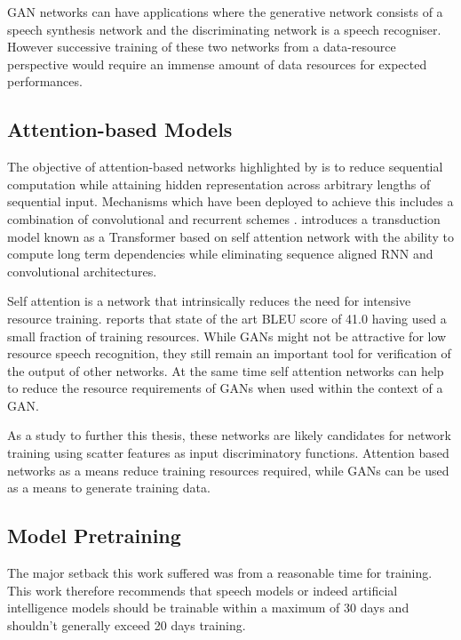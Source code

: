 GAN networks can have applications where the generative network consists of a speech synthesis network and the discriminating network is  a speech recogniser.  However successive training of these two networks from a data-resource perspective would require an immense amount of data resources for expected performances. 

\subsection{Attention-based Models}

The objective of attention-based networks highlighted by  \cite{vaswani2017attention} is to reduce sequential computation while attaining hidden representation across arbitrary lengths of sequential input. Mechanisms which have been deployed to achieve this includes a combination of convolutional and recurrent schemes \citep{kaiser2016can,kalchbrenner2016neural, gehring2017convolutional}. \cite{vaswani2017attention} introduces a transduction model known as a Transformer based on self attention network with the ability to compute long term dependencies while eliminating sequence aligned RNN and convolutional architectures.

Self attention is a network that intrinsically reduces the need for intensive resource training.  \cite{vaswani2017attention} reports that state of the art BLEU score of 41.0 having used a small fraction of training resources.  While GANs might not be attractive for low resource speech recognition, they still remain an important tool for verification of the output of other networks.  At the same time self attention networks can help to reduce the resource requirements of GANs when used within the context of a GAN.

As a study to further this thesis, these networks are likely candidates for network training using scatter features as input discriminatory functions.  Attention based networks as a means reduce training resources required, while GANs can be used as a means to generate training data.


\subsection{Model Pretraining}
The major setback this work suffered was from a reasonable time for training.  This work therefore recommends that speech models or indeed artificial intelligence models should be trainable within a maximum of 30 days and shouldn't generally exceed 20 days training.

